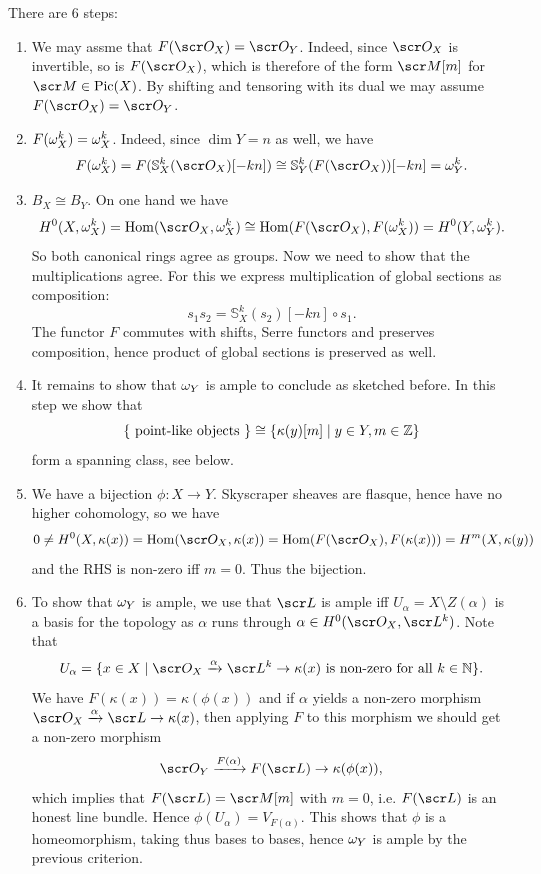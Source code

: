 \documentclass[A4paper, british, reqno]{amsart}
\theoremstyle{darkgreentheorem}
\theoremstyle{darkbluedefinition}
\theoremstyle{darkredexample}
\theoremstyle{remark}
\DeclareMathOperator{\Hom}{Hom}
\DeclareMathOperator{\Pic}{Pic}
\renewcommand{\S}{\mathbb{S}}
\newcommand{\1}{\mathbbm{1}}
\begin{document}
There are 6 steps:
\begin{enumerate}
    \item We may assme that $F(\O_{X})=\O_{Y}$.
	Indeed, since $\O_{X}$ is invertible, so is $F(\O_{X})$, which is therefore of the form $\M[m]$ for $\M\in \Pic(X)$.
	By shifting and tensoring with its dual we may assume $F(\O_{X})=\O_{Y}$.
    \item $F(\omega_{X}^{k})=\omega_{X}^{k}$.
	Indeed, since $\dim{Y}=n$ as well, we have
	\[ F(\w_{X}^{k})=F(\S_{X}^{k}(\O_{X})[-kn])\cong \S_{Y}^{k}(F(\O_{X}))[-kn]=\w_{Y}^{k}. \]
    \item $B_{X}\cong B_{Y}$.
	On one hand we have
	\[ H^{0}(X,\w_{X}^{k})=\Hom(\O_{X},\w_{X}^{k})\cong \Hom(F(\O_{X}),F(\w_{X}^{k}))=H^{0}(Y,\w_{Y}^{k}). \]
	So both canonical rings agree as groups.
	Now we need to show that the multiplications agree.
	For this we express multiplication of global sections as composition:
	\[ s_{1}s_{2}=\S_{X}^{k}(s_{2})[-kn]\circ s_{1}. \]
	The functor $F$ commutes with shifts, Serre functors and preserves composition, hence product of global sections is preserved as well.
    \item It remains to show that $\omega_{Y}$ is ample to conclude as sketched before.
	In this step we show that
	\[ \{ \text{ point-like objects }\}\cong \{ \kappa(y)[m]\mid y\in Y,m\in \mathbb{Z}\} \]
	form a spanning class, see below.
    \item We have a bijection $\phi\colon X\to Y$.
	Skyscraper sheaves are flasque, hence have no higher cohomology, so we have
	\[ 0\neq H^{0}(X,\kappa(x))=\Hom(\O_{X},\kappa(x))=\Hom(F(\O_{X}),F(\kappa(x)))=H^{m}(X,\kappa(y)) \]
	and the RHS is non-zero iff $m=0$.
	Thus the bijection.
    \item To show that $\omega_{Y}$ is ample, we use that $\L$ is ample iff $U_{\alpha}=X\setminus Z(\alpha)$ is a basis for the topology as $\alpha$ runs through $\alpha\in H^{0}(\O_{X},\L^{k})$.
	Note that
	\[ U_{\alpha}=\{x\in X\mid \O_{X}\xrightarrow{\alpha}\L^{k}\to \kappa(x) \text{ is non-zero for all }k\in \N  \}. \]
	We have $F(\kappa(x))=\kappa(\phi(x))$ and if $\alpha$ yields a non-zero morphism $\O_{X}\xrightarrow{\alpha} \L\to \kappa(x)$, then applying $F$ to this morphism we should get a non-zero morphism
	\[ \O_{Y}\xrightarrow{F(\alpha)}F(\L)\to \kappa(\phi(x)), \]
	which implies that $F(\L)=\M[m]$ with $m=0$, i.e. $F(\L)$ is an honest line bundle.
	Hence $\phi(U_{\alpha})=V_{F(\alpha)}$.
	This shows that $\phi$ is a homeomorphism, taking thus bases to bases, hence $\omega_{Y}$ is ample by the previous criterion.
\end{enumerate}
\end{document}
